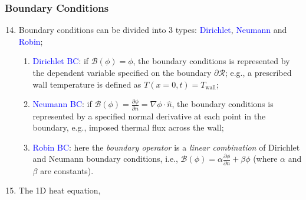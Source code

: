 \documentclass[10pt,compress,handout,ignorenonframetext]{beamer}
\begin{document}
\begin{frame}
 \frametitle{Boundary Conditions} 
 \begin{enumerate}
   \setcounter{enumi}{13}   
   \item <1-> Boundary conditions can be divided into 3 types: \textcolor{blue}{Dirichlet}, \textcolor{blue}{Neumann} and \textcolor{blue}{Robin};
      \begin{enumerate}
          \item <2-> \textcolor{blue}{Dirichlet BC}: if $\mathcal{B}\left(\phi\right)=\phi$, the boundary conditions is represented by the dependent variable specified on the boundary $\partial\mathcal{R}$; e.g., a prescribed wall temperature is defined as $T\left(x=0,t\right)=T_{\text{wall}}$;
          \item <3-> \textcolor{blue}{Neumann BC}: if $\mathcal{B}\left(\phi\right) = \frac{\partial\phi}{\partial n}=\nabla\phi\cdot\hat{n}$, the boundary conditions is represented by a specified normal derivative at each point in the boundary, e.g., imposed thermal flux across the wall;
          \item <4-> \textcolor{blue}{Robin BC}: here the {\it boundary operator} is a {\it linear combination} of Dirichlet and Neumann boundary conditions, i.e., $\mathcal{B}\left(\phi\right)=\alpha\frac{\partial\phi}{\partial n}+ \beta\phi$ (where $\alpha$ and $\beta$ are constants).
      \end{enumerate} 
   \item <5->   The 1D heat equation,
 \end{enumerate}   
 
\end{frame}
\end{document}
